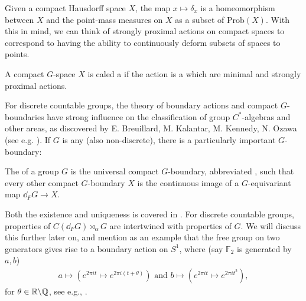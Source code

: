 \begin{note}
	Given a compact Hausdorff space $X$, the map $x \mapsto \delta_x$ is a homeomorphism between $X$ and the point-mass measures on $X$ as a subset of $\mathrm{Prob}(X)$. With this in mind, we can think of strongly proximal actions on compact spaces to correspond to having the ability to continuously deform subsets of spaces to points.
\end{note}
\begin{definition}
	A compact $G$-space $X$ is caled a  if the action is a  which are minimal and strongly proximal actions.
\end{definition}
For discrete countable groups, the theory of boundary actions and compact $G$-boundaries have strong influence on the classification of group $C^*$-algebras and other areas, as discovered by E. Breuillard, M. Kalantar, M. Kennedy, N. Ozawa (see e.g. \cite{breuillard2017c}). If $G$ is any (also non-discrete), there is a particularly important $G$-boundary:
\begin{definition}
	The  of a group $G$ is the universal compact $G$-boundary, abbreviated , such that every other compact $G$-boundary $X$ is the continuous image of a $G$-equivariant map $\dd_F G \to X$.
\end{definition}
Both the existence and uniqueness is covered in \cite[Chapter 4]{bscp}. For discrete countable groups, properties of $C(\dd_F G) \rtimes_\alpha G$ are intertwined with properties of $G$. We will discuss this further later on, and mention as an example that the free group on two generators gives rise to a boundary action on $S^1$, where (say $\mathbb{F}_2$ is generated by $a,b$)
\begin{align*}
	a \mapsto (e^{2 \pi i t} \mapsto e^{2 \pi i (t+\theta)}) \text{  and  } b \mapsto (e^{2 \pi i t} \mapsto e^{2 \pi i t^{2}}),
\end{align*}
for $\theta \in \mathbb{R}\backslash \mathbb{Q}$, see e.g., \cite[Example 4.13]{bscp}.
